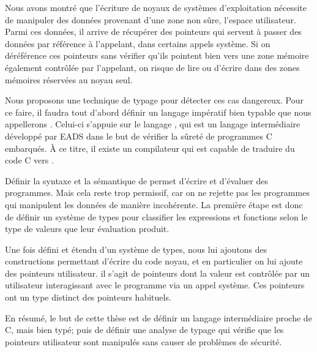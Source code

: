 
Nous avons montré que l'écriture de noyaux de systèmes d'exploitation nécessite
de manipuler des données provenant d'une zone non sûre, l'espace utilisateur.
Parmi ces données, il arrive de récupérer des pointeurs qui servent à passer des
données par référence à l'appelant, dans certains appels système. Si on
déréférence ces pointeurs sans vérifier qu'ils pointent bien vers une zone
mémoire également contrôlée par l'appelant, on risque de lire ou d'écrire dans
des zones mémoires réservées au noyau seul.

Nous proposons une technique de typage pour détecter ces cas dangereux. Pour ce
faire, il faudra tout d'abord définir un langage impératif bien typable que nous
appellerons \langname.
Celui-ci s'appuie sur le langage \newspeak, qui est un langage intermédiaire
développé par EADS dans le but de vérifier la sûreté de programmes C embarqués.
À ce titre, il existe un compilateur qui est capable de traduire du code C vers
\newspeak.

Définir la syntaxe et la sémantique de \langname permet d'écrire et d'évaluer
des programmes. Mais cela reste trop permissif, car on ne rejette pas les
programmes qui manipulent les données de manière incohérente. La première étape
est donc de définir un système de types pour classifier les expressions et
fonctions selon le type de valeurs que leur évaluation produit.

Une fois \langname défini et étendu d'un système de types, nous lui ajoutons des
constructions permettant d'écrire du code noyau, et en particulier on lui ajoute
des pointeurs utilisateur. il s'agit de pointeurs dont la valeur est contrôlée
par un utilisateur interagissant avec le programme via un appel système. Ces
pointeurs ont un type distinct des pointeurs habituels.

En résumé, le but de cette thèse est de définir un langage intermédiaire proche
de C, mais bien typé; puis de définir une analyse de typage qui vérifie
que les pointeurs utilisateur sont manipulés sans causer de problèmes de
sécurité.


